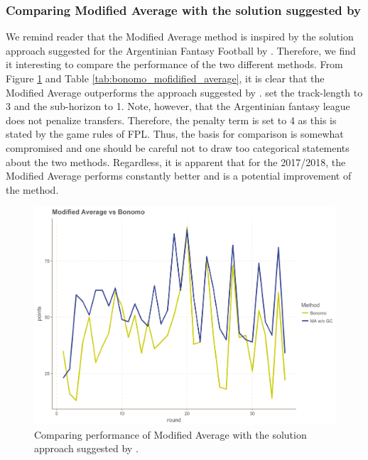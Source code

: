 \subsubsection{Comparing Modified Average with the solution suggested by \cite{Bonomo}}




We remind reader that the Modified Average method is inspired by the solution approach suggested for the Argentinian Fantasy Football by \cite{Bonomo}. Therefore, we find it interesting to compare the performance of the two different methods. From Figure \ref{fig:avg_vs_bon} and Table \ref{tab:bonomo_mofidified_average}, it is clear that the Modified Average outperforms the approach suggested by \cite{Bonomo}.\cite{Bonomo} set the track-length to 3 and the sub-horizon to 1. Note, however, that the Argentinian fantasy league does not penalize transfers. Therefore, the penalty term is set to 4 as this is stated by the game rules of FPL. Thus, the basis for comparison is somewhat compromised and one should be careful not to draw too categorical statements about the two methods. Regardless, it is apparent that for the 2017/2018, the Modified Average performs constantly better and is a potential improvement of the method.

\begin{figure}[H]
    \centering
    \includegraphics[scale=0.5]{fig/chapter_7/bon_gc_no_gc.png}
    \caption{Comparing performance of Modified Average with the solution approach suggested by \cite{Bonomo}.}
\label{fig:avg_vs_bon}    
\end{figure}

